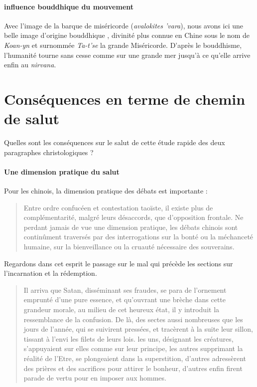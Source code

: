   \paragraph{influence bouddhique du mouvement} Avec l'image de la barque de miséricorde (\emph{avalokites 'vara}), nous avons ici une belle image d'origine bouddhique , divinité plus connue en Chine sous le nom de \emph{Koan-yn} et surnommée \emph{Ta-t'se} la grande Miséricorde. D'après le bouddhisme, l'humanité tourne sans cesse comme sur une grande mer jusqu'à ce qu'elle arrive enfin au \textit{nirvana}. 
  
\section{Conséquences en terme de chemin de salut}

Quelles sont les conséquences sur le salut de cette étude rapide des deux paragraphes christologiques ?

\paragraph{Une dimension pratique du salut} Pour les chinois, la dimension pratique des débats est importante : 

\begin{quote}
    Entre ordre confucéen et contestation taoïste, il existe plus de complémentarité, malgré leurs désaccords, que d’opposition frontale. Ne perdant jamais de vue une dimension pratique, les débats chinois sont continûment traversés par des interrogations sur la bonté ou la méchanceté humaine, sur la bienveillance ou la cruauté nécessaire des souverains.

\cite[p. 147]{PolDroit:voyage}  
\end{quote}
 Regardons dans cet esprit le passage sur le mal qui précède les sections sur l'incarnation et la rédemption.
\begin{quote}
   Il arriva que Satan, disséminant ses fraudes, se para de l'ornement emprunté d'une pure essence, et qu'ouvrant une brèche dans cette grandeur morale, au milieu de cet heureux état, il y introduit la ressemblance de la confusion.
De là, des sectes aussi nombreuses que les jours de l'année, qui se suivirent pressées, et tracèrent à la suite leur sillon, tissant à l'envi les filets de leurs lois. les uns, désignant les créatures, s'appuyaient sur elles comme sur leur principe, les autres supprimant la réalité de l'Etre, se plongeaient dans la superstition, d'autres adressèrent des prières et des sacrifices pour attirer le bonheur, d'autres enfin firent parade de vertu pour en imposer aux hommes. 
\end{quote}
 
